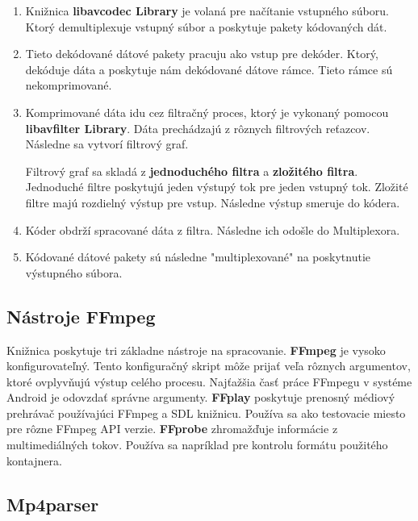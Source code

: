 \documentclass[12pt, oneside]{book}
\begin{document}
\begin{enumerate}


\item Knižnica \textbf{libavcodec Library} je volaná pre načítanie vstupného súboru. Ktorý demultiplexuje vstupný súbor a poskytuje pakety kódovaných dát.

\item Tieto dekódované dátové pakety pracuju ako vstup pre dekóder. Ktorý, dekóduje dáta a poskytuje nám dekódované dátove rámce. Tieto rámce sú nekomprimované.


\item Komprimované dáta idu cez filtračný proces, ktorý je vykonaný pomocou \textbf{libavfilter Library}. Dáta prechádzajú z rôznych filtrových reťazcov. Následne sa vytvorí filtrový graf.

Filtrový graf sa skladá z \textbf{jednoduchého filtra} a \textbf{zložitého filtra}. Jednoduché filtre poskytujú jeden výstupý tok pre jeden vstupný tok. Zložité filtre majú rozdielný výstup pre vstup. Následne výstup smeruje do kódera.

\item Kóder obdrží spracované dáta z filtra. Následne ich odošle do Multiplexora.

\item Kódované dátové pakety sú následne "multiplexované" na poskytnutie výstupného súbora. \cite{ffmpeg02}

\end{enumerate}

\subsection{Nástroje FFmpeg}

\hspace{15pt} Knižnica poskytuje tri základne nástroje na spracovanie.
\textbf{FFmpeg} je vysoko konfigurovateľný. Tento konfiguračný skript môže prijať veľa rôznych argumentov, ktoré ovplyvňujú výstup celého procesu. Najťažšia časť práce FFmpegu v systéme Android je odovzdať správne argumenty.
\textbf{FFplay} poskytuje prenosný médiový prehrávač používajúci FFmpeg a SDL knižnicu. Používa sa ako testovacie miesto pre rôzne FFmpeg API verzie.
\textbf{FFprobe} zhromažďuje informácie z multimediálných tokov. Používa sa napríklad pre kontrolu formátu použitého kontajnera.

\subsection{Mp4parser}
\end{document}
